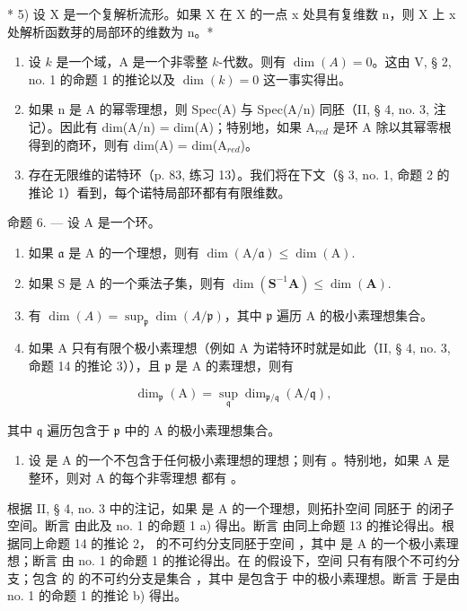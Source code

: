 * 5) 设 X 是一个复解析流形。如果 X 在 X 的一点 x 处具有复维数 n，则 X 上 x 处解析函数芽的局部环的维数为 n。*

\begin{enumerate}
\def\labelenumi{\arabic{enumi})}
\setcounter{enumi}{5}
\item
设 \(k\) 是一个域，A 是一个非零整 \(k\)-代数。则有 \(\dim(A) = 0\)。这由 V, § 2, no. 1 的命题 1 的推论以及 \(\dim(k) = 0\) 这一事实得出。
\item
如果 n 是 A 的幂零理想，则 Spec(A) 与 Spec(A/n) 同胚（II, § 4, no. 3, 注记）。因此有 dim(A/n) = dim(A)；特别地，如果 A\(_{red}\) 是环 A 除以其幂零根得到的商环，则有 dim(A) = dim(A\(_{red}\))。
\item
存在无限维的诺特环（p. 83, 练习 13）。我们将在下文（§ 3, no. 1, 命题 2 的推论 1）看到，每个诺特局部环都有有限维数。
\end{enumerate}

命题 6. --- 设 A 是一个环。

\begin{enumerate}
\def\labelenumi{\alph{enumi})}
\item
  如果 \(\mathfrak{a}\) 是 A 的一个理想，则有 \(\dim (\mathrm{A} / \mathfrak{a})\leqslant \dim (\mathrm{A}).\)
\item
  如果 S 是 A 的一个乘法子集，则有 \(\dim (\mathbf{S}^{-1}\mathbf{A})\leqslant \dim (\mathbf{A}).\)
\item
有 \(\dim(A) = \sup_{\mathfrak{p}} \dim(A/\mathfrak{p})\)，其中 \(\mathfrak{p}\) 遍历 A 的极小素理想集合。
\item
如果 A 只有有限个极小素理想（例如 A 为诺特环时就是如此（II, § 4, no. 3, 命题 14 的推论 3）），且 \(\mathfrak{p}\) 是 A 的素理想，则有
\end{enumerate}

\[
\dim_ {\mathfrak {p}} (\mathrm{A}) = \sup _ {\mathfrak {q}} \dim_ {\mathfrak {p} / \mathfrak {q}} (\mathrm{A} / \mathfrak {q}),
\]

其中 \(\mathfrak{q}\) 遍历包含于 \(\mathfrak{p}\) 中的 A 的极小素理想集合。

\begin{enumerate}
\def\labelenumi{\alph{enumi})}
\setcounter{enumi}{4}
\tightlist
\item
设  是 A 的一个不包含于任何极小素理想的理想；则有 。特别地，如果 A 是整环，则对 A 的每个非零理想  都有 。
\end{enumerate}

根据 II, § 4, no. 3 中的注记，如果  是 A 的一个理想，则拓扑空间  同胚于  的闭子空间。断言  由此及 no. 1 的命题 1 a) 得出。断言  由同上命题 13 的推论得出。根据同上命题 14 的推论 2， 的不可约分支同胚于空间 ，其中  是 A 的一个极小素理想；断言  由 no. 1 的命题 1 的推论得出。在  的假设下，空间  只有有限个不可约分支；包含  的  的不可约分支是集合 ，其中  是包含于  中的极小素理想。断言  于是由 no. 1 的命题 1 的推论 b) 得出。

